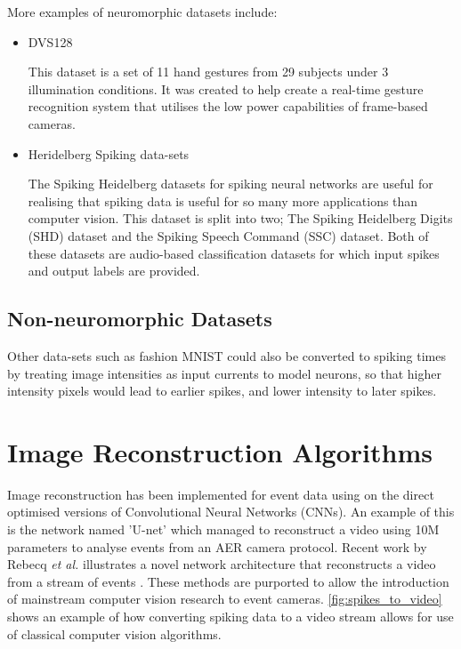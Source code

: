 More examples of neuromorphic datasets include:

\begin{itemize}
      \item DVS128

            This dataset is a set of 11 hand gestures from 29 subjects under 3 illumination conditions. It was created to help create a real-time gesture recognition system that utilises the low power capabilities of frame-based cameras\cite{DVS128}.
      \item Heridelberg Spiking data-sets

            The Spiking Heidelberg datasets for spiking neural networks\cite{SpikingHeidelberg} are useful for realising that spiking data is useful for so many more applications than computer vision. This dataset is split into two; The Spiking Heidelberg Digits (SHD) dataset and the Spiking Speech Command (SSC) dataset. Both of these datasets are audio-based classification datasets for which input spikes and output labels are provided.
\end{itemize}

\subsection{Non-neuromorphic Datasets}

Other data-sets such as fashion MNIST could also be converted to spiking times by treating image intensities as input currents to model neurons, so that higher intensity pixels would lead to earlier spikes, and lower intensity to later spikes.

\section{Image Reconstruction Algorithms}

Image reconstruction has been implemented for event data using on the direct optimised versions of Convolutional Neural Networks (CNNs). An example of this is the network named 'U-net'\cite{UNET} which managed to reconstruct a video using 10M parameters to analyse events from an AER camera protocol. Recent work by Rebecq \textit{et al.} illustrates a novel network architecture that reconstructs a video from a stream of events \cite{spikingToVideo}. These methods are purported to allow the introduction of mainstream computer vision research to event cameras. \autoref{fig:spikes_to_video} shows an example of how converting spiking data to a video stream allows for use of classical computer vision algorithms.

